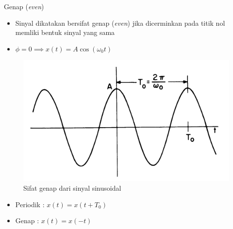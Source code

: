 \documentclass[aspectratio=169]{beamer}
\begin{document}
\begin{frame}{Genap (\textit{even})}
	\begin{itemize}
		\item Sinyal dikatakan bersifat genap (\textit{even}) jika dicerminkan pada titik nol memliki bentuk sinyal yang sama
		\item $ \phi = 0 \implies x(t) = A \cos(\omega_0 t) $	
	\end{itemize}
	\begin{figure}
		\centering
		\includegraphics[height=0.35\textheight]{gambar/01.sinyal_genap}
		\caption{Sifat genap dari sinyal sinusoidal}
	\end{figure}
	\begin{itemize}
		\item Periodik : $ x(t) = x(t + T_0) $
		\item Genap : $ x(t) = x(-t) $
	\end{itemize}
\end{frame}
\end{document}
